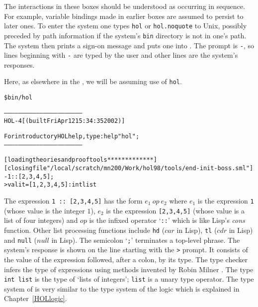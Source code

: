 The interactions in these boxes should be understood as occurring in
sequence.  For example, variable bindings made in earlier boxes are
assumed to persist to later ones.  To enter the \HOL{} system one
types {\small\verb|hol|} or {\small\verb|hol.noquote|} to Unix,
possibly preceded by path information if the \HOL{} system's
\texttt{bin} directory is not in one's path.  The \HOL{} system then
prints a sign-on message and puts one into \ML.  The \ML{} prompt is
{\small\verb|-|}, so lines beginning with {\small\verb|-|} are typed
by the user and other lines are the system's responses.

  Here, as elsewhere in the \TUTORIAL{}, we will be assuming use of
  {\small\verb|hol|}.

\setcounter{sessioncount}{0}
\begin{session}\begin{alltt}
\$ bin/hol

-----------------------------------------------------------------
       HOL-4 [\holnsversion (built Fri Apr 12 15:34:35 2002)]

       For introductory HOL help, type: help "hol";
-----------------------------------------------------------------

[loading theories and proof tools ************* ]
[closing file "/local/scratch/mn200/Work/hol98/tools/end-init-boss.sml"]
- 1 :: [2,3,4,5];
> val it = [1, 2, 3, 4, 5] : int list
\end{alltt}
\end{session}

The \ML{} expression {\small\verb|1 :: [2,3,4,5]|} has the form $e_1\
op\ e_2$ where $e_1$ is the expression {\small\verb|1|} (whose value
is the integer $1$), $e_2$ is the expression {\small\verb|[2,3,4,5]|}
(whose value is a list of four integers) and $op$ is the infixed
operator `{\small\verb|::|}' which is like Lisp's {\it cons} function.
Other list processing functions include {\small\verb|hd|} ($car$ in
Lisp), {\small\verb|tl|} ($cdr$ in Lisp) and {\small\verb|null|}
($null$ in Lisp).  The semicolon `{\small\verb|;|}' terminates a
top-level phrase.  The system's response is shown on the line starting
with the {\small\verb|>|} prompt.  It consists of the value of the
expression followed, after a colon, by its type. The \ML{} type checker
infers the type of expressions using methods invented by Robin Milner
\cite{Milner-types}. The type {\small\verb|int list|} is the type of
`lists of integers'; {\small\verb|list|} is a unary type operator.
The type system of \ML{} is very similar to the type system of the
\HOL{} logic which is explained in Chapter~\ref{HOLlogic}.

